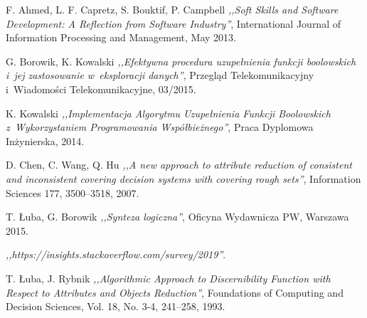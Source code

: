 
\begin{thebibliography}{99}


 F. Ahmed, L. F. Capretz, S. Bouktif, P. Campbell \emph{,,Soft Skills and Software Development: A Reflection from Software Industry''}, International Journal of Information Processing and Management, May 2013.

 G. Borowik, K. Kowalski \emph{,,Efektywna procedura uzupełnienia funkcji boolowskich i~jej zastosowanie w~eksploracji danych''}, Przegląd Telekomunikacyjny i~Wiadomości Telekomunikacyjne, 03/2015.

 K. Kowalski \emph{,,Implementacja Algorytmu Uzupełnienia Funkcji Boolowskich z~Wykorzystaniem Programowania Współbieżnego''}, Praca Dyplomowa Inżynierska, 2014.

 D. Chen, C. Wang, Q. Hu \emph{,,A new approach to attribute reduction of consistent and inconsistent covering decision systems with covering rough sets''}, Information Sciences 177, 3500–3518, 2007.

 T. Łuba, G. Borowik \emph{,,Synteza logiczna''}, Oficyna Wydawnicza PW, Warszawa 2015.

 \emph{,,https://insights.stackoverflow.com/survey/2019''}.

 T. Łuba, J. Rybnik \emph{,,Algorithmic Approach to Discernibility Function with Respect to Attributes and Objects Reduction''}, Foundations of Computing and Decision Sciences, Vol. 18, No. 3-4, 241–258, 1993.


\end{thebibliography}
